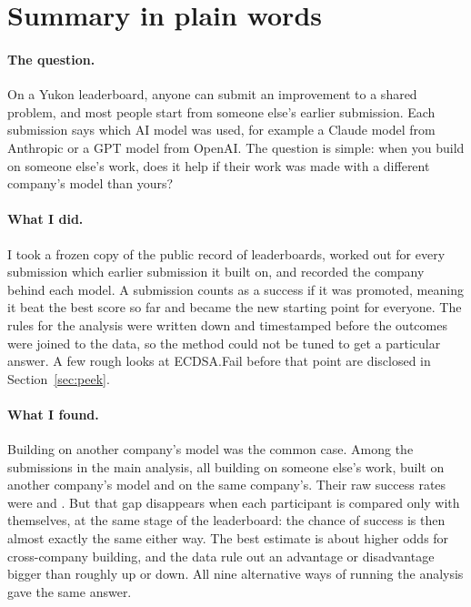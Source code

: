\section*{Summary in plain words}

\paragraph{The question.}
On a Yukon leaderboard, anyone can submit an improvement to a shared problem, and most people start from someone else's earlier submission.
Each submission says which AI model was used, for example a Claude model from Anthropic or a GPT model from OpenAI.
The question is simple: when you build on someone else's work, does it help if their work was made with a different company's model than yours?

\paragraph{What I did.}
I took a frozen copy of the public record of \StudyK{} leaderboards, worked out for every submission which earlier submission it built on, and recorded the company behind each model.
A submission counts as a success if it was promoted, meaning it beat the best score so far and became the new starting point for everyone.
The rules for the analysis were written down and timestamped before the outcomes were joined to the data, so the method could not be tuned to get a particular answer.
A few rough looks at ECDSA.Fail before that point are disclosed in Section~\ref{sec:peek}.

\paragraph{What I found.}
Building on another company's model was the common case.
Among the \PrimaryRowsTotal{} submissions in the main analysis, all building on someone else's work, \RawCrossRows{} built on another company's model and \RawSameRows{} on the same company's.
Their raw success rates were \RawCrossRate{} and \RawSameRate{}.
But that gap disappears when each participant is compared only with themselves, at the same stage of the leaderboard: the chance of success is then almost exactly the same either way.
The best estimate is about \PlainPointPct{} higher odds for cross-company building, and the data rule out an advantage or disadvantage bigger than roughly \PlainHighPct{} up or \PlainLowPct{} down.
All nine alternative ways of running the analysis gave the same answer.

